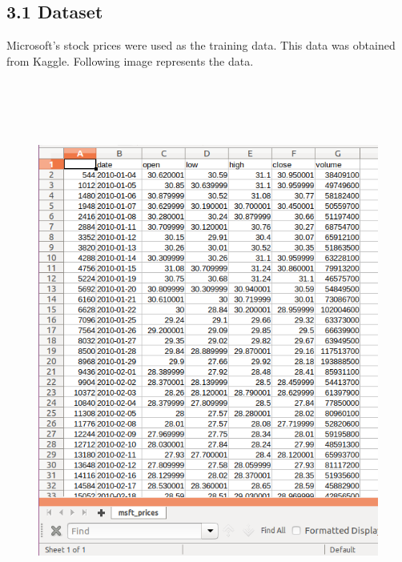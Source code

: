 \documentclass[12pt]{article}
\begin{document}
\subsection*{3.1 Dataset}

\vspace{\baselineskip}
Microsoft’s stock prices were used as the training data. This data was obtained from Kaggle. Following image represents the data.\par


\vspace{\baselineskip}



\begin{figure}[H]
	\begin{Center}
		\includegraphics[width=5.8in,height=7.02in]{./media/image9.png}
	\end{Center}
\end{figure}
\end{document}
